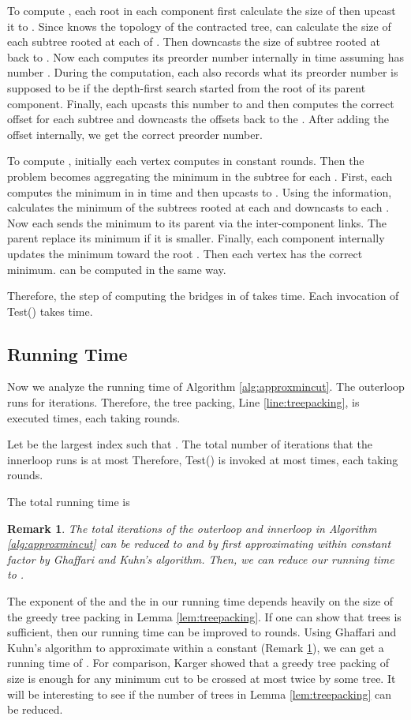 \documentclass[11pt]{article}
\newtheorem{remark}[theorem]{Remark}
\begin{document}
To compute , each root  in each component first calculate the size of  then upcast it to . Since  knows the topology of the contracted tree,  can calculate the size of each subtree rooted at each of . Then  downcasts the size of subtree rooted at  back to . Now each  computes its preorder number internally in  time assuming  has number . During the computation, each  also records what its preorder number is supposed to be if the depth-first search started from the root of its parent component. Finally, each  upcasts this number to  and then  computes the correct offset for each subtree and downcasts the offsets back to the . After adding the offset internally, we get the correct preorder number.

To compute , initially each vertex  computes  in constant rounds. Then the problem becomes aggregating the minimum in the subtree  for each . First, each  computes the minimum in  in  time and then upcasts to . Using the information,  calculates the minimum of the subtrees rooted at each  and downcasts to each . Now each  sends the minimum to its parent via the inter-component links. The parent replace its minimum if it is smaller. Finally, each component  internally updates the minimum toward the root . Then each vertex has the correct minimum.  can be computed in the same way.

Therefore, the step of computing the bridges in  of  takes  time. Each invocation of Test() takes  time. 

\subsection{Running Time}
Now we analyze the running time of Algorithm \ref{alg:approxmincut}. The outerloop runs for  iterations. Therefore, the tree packing, Line \ref{line:treepacking}, is executed  times, each taking  rounds.

Let  be the largest index such that . The total number of iterations that the innerloop runs is at most 
Therefore, Test() is invoked at most  times, each taking  rounds. 

The total running time is


\begin{remark}\label{rmk:combinedGK} The total iterations of the outerloop and innerloop in Algorithm \ref{alg:approxmincut} can be reduced to  and  by first approximating  within constant factor by Ghaffari and Kuhn's algorithm. Then, we can reduce our running time to .\end{remark}

The exponent of the  and the  in our running time depends heavily on the size of the greedy tree packing in Lemma \ref{lem:treepacking}. If one can show that  trees is sufficient, then our running time can be improved to  rounds. Using Ghaffari and Kuhn's algorithm to approximate  within a constant (Remark \ref{rmk:combinedGK}), we can get a running time of . For comparison, Karger \cite{Karger2000} showed that a greedy tree packing of size  is enough for any minimum cut to be crossed at most twice by some tree. It will be interesting to see if the number of trees in Lemma \ref{lem:treepacking} can be reduced.



\end{document}

